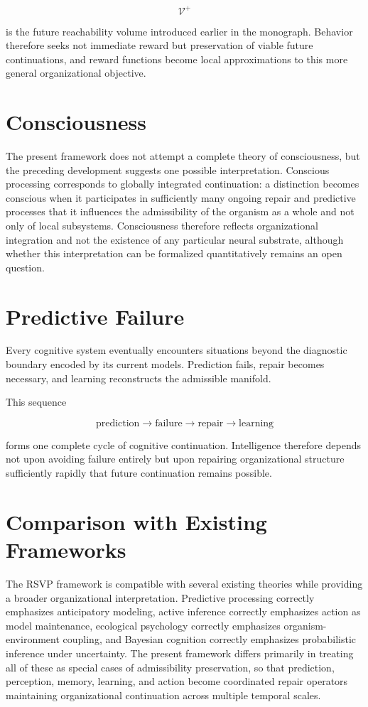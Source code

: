\documentclass[11pt,oneside]{book}
\numberwithin{equation}{chapter}
\theoremstyle{definition}
\theoremstyle{plain}
\begin{document}
\[
\mathcal V^+
\]

is the future reachability volume introduced earlier in the monograph. Behavior therefore seeks not immediate reward but preservation of viable future continuations, and reward functions become local approximations to this more general organizational objective.

\section{Consciousness}

The present framework does not attempt a complete theory of consciousness, but the preceding development suggests one possible interpretation. Conscious processing corresponds to globally integrated continuation: a distinction becomes conscious when it participates in sufficiently many ongoing repair and predictive processes that it influences the admissibility of the organism as a whole and not only of local subsystems. Consciousness therefore reflects organizational integration and not the existence of any particular neural substrate, although whether this interpretation can be formalized quantitatively remains an open question.

\section{Predictive Failure}

Every cognitive system eventually encounters situations beyond the diagnostic boundary encoded by its current models. Prediction fails, repair becomes necessary, and learning reconstructs the admissible manifold.

This sequence

\[
\text{prediction}
\rightarrow
\text{failure}
\rightarrow
\text{repair}
\rightarrow
\text{learning}
\]

forms one complete cycle of cognitive continuation. Intelligence therefore depends not upon avoiding failure entirely but upon repairing organizational structure sufficiently rapidly that future continuation remains possible.

\section{Comparison with Existing Frameworks}

The RSVP framework is compatible with several existing theories while providing a broader organizational interpretation. Predictive processing correctly emphasizes anticipatory modeling, active inference correctly emphasizes action as model maintenance, ecological psychology correctly emphasizes organism-environment coupling, and Bayesian cognition correctly emphasizes probabilistic inference under uncertainty. The present framework differs primarily in treating all of these as special cases of admissibility preservation, so that prediction, perception, memory, learning, and action become coordinated repair operators maintaining organizational continuation across multiple temporal scales.
\end{document}
